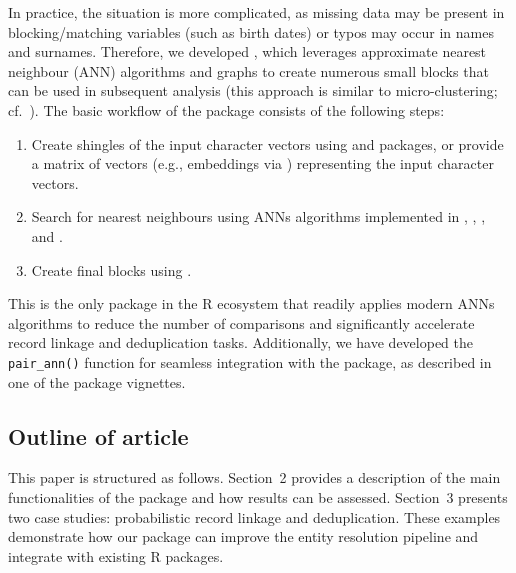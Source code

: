 In practice, the situation is more complicated, as missing data may be
present in blocking/matching variables (such as birth dates) or typos
may occur in names and surnames. Therefore, we developed
, which leverages approximate nearest neighbour (ANN)
algorithms and graphs to create numerous small blocks that can be used
in subsequent analysis (this approach is similar to micro-clustering;
cf.~\citet{johndrow2018theoretical}). The basic workflow of the
 package consists of the following steps:

\begin{enumerate}
\def\labelenumi{\arabic{enumi}.}
\tightlist
\item
  Create shingles of the input character vectors using
   \citep{tokenizers} and 
  \citep{text2vec} packages, or provide a matrix of vectors (e.g.,
  embeddings via  \citep{ragnar}) representing the input
  character vectors.
\item
  Search for nearest neighbours using ANNs algorithms implemented in
   \citep{rnndescent},  \citep{RcppHNSW},
   \citep[\citet{mlpack2025}]{mlpack2023}, and 
  \citep{RcppAnnoy}.
\item
  Create final blocks using  \citep[
  \citet{igraph2006}]{igraph2025}.
\end{enumerate}

This is the only package in the R ecosystem that readily applies modern
ANNs algorithms to reduce the number of comparisons and significantly
accelerate record linkage and deduplication tasks. Additionally, we have
developed the \texttt{pair\_ann()} function for seamless integration with the
 package, as described in one of the package vignettes.

\subsection{Outline of article}\label{outline-of-article}

This paper is structured as follows. Section~2 provides a description of
the main functionalities of the  package and how
results can be assessed. Section~3 presents two case studies:
probabilistic record linkage and deduplication. These examples
demonstrate how our package can improve the entity resolution pipeline
and integrate with existing R packages.

